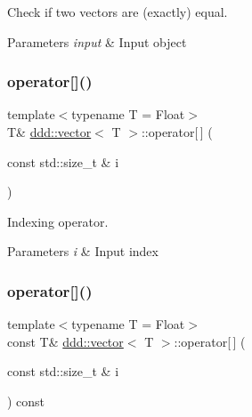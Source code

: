 Check if two vectors are (exactly) equal. 


\begin{DoxyParams}{Parameters}
{\em input} & Input object \\
\hline
\end{DoxyParams}
\mbox{\label{classddd_1_1vector_a38e2123649fc4ebf839f22e5061b9497}} 
\subsubsection{\texorpdfstring{operator[]()}{operator[]()}\hspace{0.1cm}{\footnotesize\ttfamily [1/2]}}
{\footnotesize\ttfamily template$<$typename T = Float$>$ \\
T\& \hyperlink{classddd_1_1vector}{ddd\+::vector}$<$ T $>$\+::operator\mbox{[}$\,$\mbox{]} (\begin{DoxyParamCaption}\item[{const std\+::size\+\_\+t \&}]{i }\end{DoxyParamCaption})\hspace{0.3cm}{\ttfamily [inline]}}



Indexing operator. 


\begin{DoxyParams}{Parameters}
{\em i} & Input index \\
\hline
\end{DoxyParams}
\mbox{\label{classddd_1_1vector_a7e8d544a596450edb30914dcc21159fc}} 
\subsubsection{\texorpdfstring{operator[]()}{operator[]()}\hspace{0.1cm}{\footnotesize\ttfamily [2/2]}}
{\footnotesize\ttfamily template$<$typename T = Float$>$ \\
const T\& \hyperlink{classddd_1_1vector}{ddd\+::vector}$<$ T $>$\+::operator\mbox{[}$\,$\mbox{]} (\begin{DoxyParamCaption}\item[{const std\+::size\+\_\+t \&}]{i }\end{DoxyParamCaption}) const\hspace{0.3cm}{\ttfamily [inline]}}



